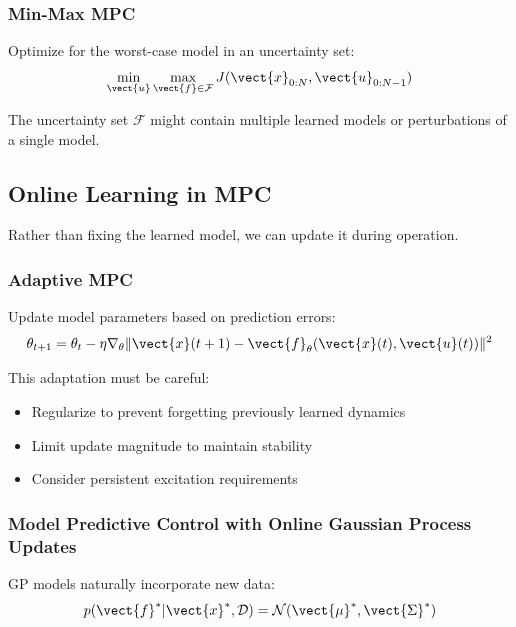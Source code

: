\subsubsection{Min-Max MPC}

Optimize for the worst-case model in an uncertainty set:
\begin{equation}
\min_{\vect{u}} \max_{\vect{f} \in \mathcal{F}} J(\vect{x}_{0:N}, \vect{u}_{0:N-1})
\end{equation}

The uncertainty set $\mathcal{F}$ might contain multiple learned models or perturbations of a single model.

\subsection{Online Learning in MPC}

Rather than fixing the learned model, we can update it during operation.

\subsubsection{Adaptive MPC}

Update model parameters based on prediction errors:
\begin{equation}
\theta_{t+1} = \theta_t - \eta \nabla_\theta \|\vect{x}(t+1) - \vect{f}_\theta(\vect{x}(t), \vect{u}(t))\|^2
\label{eq:online_update}
\end{equation}

This adaptation must be careful:
\begin{itemize}
    \item Regularize to prevent forgetting previously learned dynamics
    \item Limit update magnitude to maintain stability
    \item Consider persistent excitation requirements
\end{itemize}

\subsubsection{Model Predictive Control with Online Gaussian Process Updates}

GP models naturally incorporate new data:
\begin{equation}
p(\vect{f}^* | \vect{x}^*, \mathcal{D}) = \mathcal{N}(\vect{\mu}^*, \vect{\Sigma}^*)
\label{eq:gp_posterior}
\end{equation}

